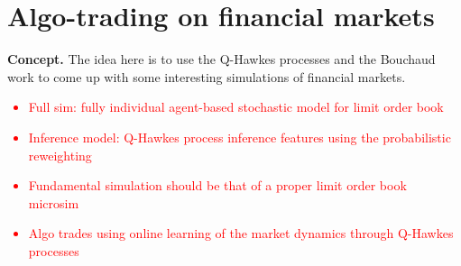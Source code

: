 \chapter{\sffamily Algo-trading on financial markets}

{\bfseries\sffamily Concept.} The idea here is to use the Q-Hawkes processes and the Bouchaud work to come up with some interesting simulations of financial markets. 

\textcolor{red}{
\begin{itemize}
\item{Full sim: fully individual agent-based stochastic model for limit order book}
\item{Inference model: Q-Hawkes process inference features using the probabilistic reweighting }
\end{itemize}
}

\textcolor{red}{
\begin{itemize}
\item{Fundamental simulation should be that of a proper limit order book microsim~\cite{bouchaud2018trades}}
\item{Algo trades using online learning of the market dynamics through Q-Hawkes processes} 
\end{itemize}
}

